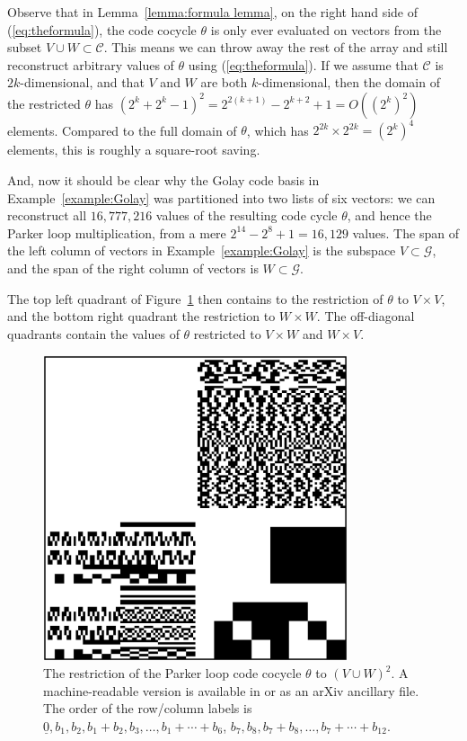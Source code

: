 \documentclass{article}
\theoremstyle{plain}
\theoremstyle{definition}
\def \cC {\mathcal{C}}
\def \cG {\mathcal{G}}
\begin{document}
Observe that in Lemma~\ref{lemma:formula lemma}, on the right hand side of (\ref{eq:theformula}), the code cocycle $\theta$ is only ever evaluated on vectors from the subset $V \cup W \subset \cC$.
This means we can throw away the rest of the array and still reconstruct arbitrary values of $\theta$ using (\ref{eq:theformula}).
If we assume that $\cC$ is $2k$-dimensional, and that $V$ and $W$ are both $k$-dimensional, then the domain of the restricted $\theta$ has $(2^k+2^k - 1)^2 = 2^{2(k+1)} - 2^{k+2} + 1 = O((2^k)^2)$ elements. 
Compared to the full domain of $\theta$, which has $2^{2k}\times 2^{2k} = (2^k)^4$ elements, this is roughly a square-root saving.

And, now it should be clear why the Golay code basis in Example~\ref{example:Golay} was partitioned into two lists of six vectors: we can reconstruct all $16,777,216$ values of the resulting code cycle $\theta$, and hence the Parker loop multiplication, from a mere $2^{14} - 2^8 + 1 = 16,129$ values.
The span of the left column of vectors in Example~\ref{example:Golay} is the subspace $V\subset \cG$, and the span of the right column of vectors is $W\subset \cG$.

The top left quadrant of Figure~\ref{fig:Parker cocycle} then contains to the restriction of $\theta$ to $V\times V$, and the bottom right quadrant the restriction to $W\times W$. 
The off-diagonal quadrants contain the values of $\theta$ restricted to $V\times W$ and $W\times V$.

\begin{figure}[ht]
\begin{center}
\includegraphics[width=0.8\textwidth]{alpha_awesum.png}
\end{center}
\caption{The restriction of the Parker loop code cocycle $\theta$ to $(V\cup W)^2$. A machine-readable version is available in \cite{RN_GH} or as an arXiv ancillary file. The order of the row/column labels is $\underline{0},b_1,b_2,b_1+b_2,b_3,\ldots, b_1+\cdots +b_6$, $b_7,b_8,b_7+b_8,\ldots,b_7+\cdots + b_{12}$.}
\label{fig:Parker cocycle}
\end{figure}
\end{document}
